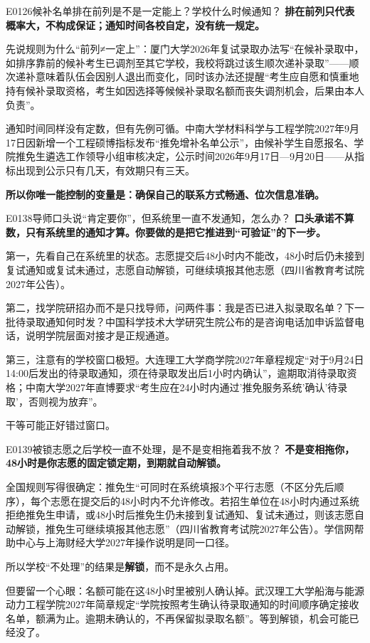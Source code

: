 \begin{qa}{E0126}{候补名单排在前列是不是一定能上？学校什么时候通知？}
\textbf{排在前列只代表概率大，不构成保证；通知时间各校自定，没有统一规定。}

先说规则为什么“前列≠一定上”：厦门大学2026年复试录取办法写“在候补录取中，如排序靠前的候补考生已调剂至其它学校，我校将跳过该生顺次递补录取”——顺次递补意味着队伍会因别人退出而变化，同时该办法还提醒“考生应自愿和慎重地持有候补录取资格，考生如因选择等候候补录取名额而丧失调剂机会，后果由本人负责”。

通知时间同样没有定数，但有先例可循。中南大学材料科学与工程学院2027年9月17日因新增一个工程硕博指标发布“推免增补名单公示”，由候补学生自愿报名、学院推免生遴选工作领导小组审核决定，公示时间2026年9月17日—9月20日——从指标出现到公示只有几天，有效期只有三天。

\textbf{所以你唯一能控制的变量是：确保自己的联系方式畅通、位次信息准确。}
\end{qa}

\begin{qa}{E0138}{导师口头说“肯定要你”，但系统里一直不发通知，怎么办？}
\textbf{口头承诺不算数，只有系统里的通知才算。你要做的是把它推进到“可验证”的下一步。}

第一，先看自己在系统里的状态。志愿提交后48小时内不能改，48小时后仍未接到复试通知或复试未通过，志愿自动解锁，可继续填报其他志愿（四川省教育考试院2027年公告）。

第二，找学院研招办而不是只找导师，问两件事：我是否已进入拟录取名单？下一批待录取通知何时发？中国科学技术大学研究生院公布的是咨询电话加申诉监督电话，说明学院层面对接才是正规通道。

第三，注意有的学校窗口极短。大连理工大学商学院2027年章程规定“对于9月24日14:00后发出的待录取通知，须在待录取发出后1小时内确认”，逾期取消待录取资格；中南大学2027年直博要求“考生应在24小时内通过'推免服务系统'确认'待录取'，否则视为放弃”。

干等可能正好错过窗口。
\end{qa}

\begin{qa}{E0139}{被锁志愿之后学校一直不处理，是不是变相拖着我不放？}
\textbf{不是变相拖你，48小时是你志愿的固定锁定期，到期就自动解锁。}

全国规则写得很确定：推免生“可同时在系统填报3个平行志愿（不区分先后顺序），每个志愿在提交后的48小时内不允许修改。若招生单位在48小时内通过系统拒绝推免生申请，或48小时后推免生仍未接到复试通知、复试未通过，则该志愿自动解锁，推免生可继续填报其他志愿”（四川省教育考试院2027年公告）。学信网帮助中心与上海财经大学2027年操作说明是同一口径。

所以学校“不处理”的结果是\textbf{解锁}，而不是永久占用。

但要留一个心眼：名额可能在这48小时里被别人确认掉。武汉理工大学船海与能源动力工程学院2027年简章规定“学院按照考生确认待录取通知的时间顺序确定接收名单，额满为止。逾期未确认的，不再保留拟录取名额”。等到解锁，机会可能已经没了。
\end{qa}

